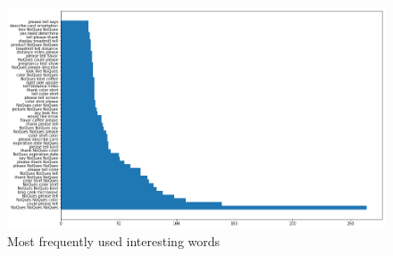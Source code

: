 \documentclass[sigconf]{acmart}
\begin{document}
\begin{figure}[bp]
        \centering
        \includegraphics[scale=0.5]{images/trigram_interesting.png}  
        \caption{Most frequently used interesting words} 
          \label{fig:tri_int}   
\end{figure}



%
\end{document}
